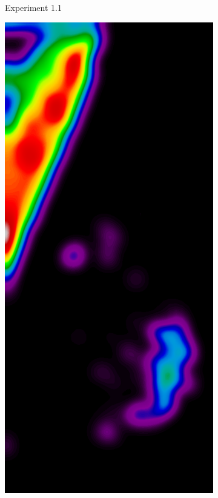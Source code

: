 \begin{figure}[h!]
\begin{subfigure}{0.195\textwidth}
		\caption{Experiment 1.1}
    \end{subfigure}
	\begin{subfigure}{0.195\textwidth}
		\centering
			\includegraphics[width=\textwidth]{plots/examples/example5_probs_1_2.png}

\end{subfigure}
\end{figure}
